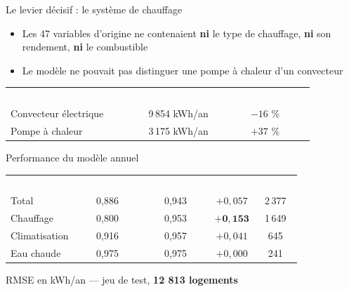 \begin{frame}{Le levier décisif : le système de chauffage}
\vspace{0.2em}
\begin{itemize}\setlength{\itemsep}{0.4em}
  \item Les 47 variables d'origine ne contenaient \textbf{ni} le type de
  chauffage, \textbf{ni} son rendement, \textbf{ni} le combustible
  \item Le modèle ne pouvait pas distinguer une pompe à chaleur d'un convecteur
\end{itemize}

\vspace{0.7em}
\centering\small
\renewcommand{\arraystretch}{1.3}
\begin{tabular}{@{}l c c@{}}
\rowcolor{BleuFonce}
\textcolor{white}{\textbf{À besoin thermique égal}} &
\textcolor{white}{\textbf{Consommation}} &
\textcolor{white}{\textbf{Biais du modèle}} \\
\rowcolor{RougeFaible} Convecteur électrique & 9\,854 kWh/an & $-16$ \% \\
\rowcolor{VertOK} Pompe à chaleur & 3\,175 kWh/an & $+37$ \% \\
\end{tabular}

\vspace{0.9em}
\end{frame}

\begin{frame}{Performance du modèle annuel}
\vspace{0.4em}
\centering\small
\renewcommand{\arraystretch}{1.35}
\begin{tabular}{@{}l c c c c@{}}
\rowcolor{BleuFonce}
\textcolor{white}{\textbf{Usage}} & \textcolor{white}{\textbf{47 variables}} &
\textcolor{white}{\textbf{61 variables}} & \textcolor{white}{\textbf{$\Delta$}} &
\textcolor{white}{\textbf{RMSE}} \\
\rowcolor{GrisLeger} Total & 0,886 & 0,943 & $+0{,}057$ & 2\,377 \\
Chauffage & 0,800 & 0,953 & \cellcolor{VertOK}$\mathbf{+0{,}153}$ & 1\,649 \\
\rowcolor{GrisLeger} Climatisation & 0,916 & 0,957 & $+0{,}041$ & 645 \\
Eau chaude & 0,975 & 0,975 & $+0{,}000$ & 241 \\
\end{tabular}

\vspace{0.5em}
{\footnotesize RMSE en kWh/an --- jeu de test, \textbf{12 813 logements}}

\vspace{0.8em}
\end{frame}


